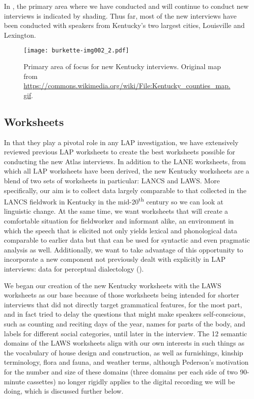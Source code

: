 \documentclass[output=paper]{langscibook}
\begin{document}
In , the primary area where we have conducted and will continue to conduct new interviews is indicated by shading. Thus far, most of the new interviews have been conducted with speakers from Kentucky’s two largest cities, Louisville and Lexington.

\begin{figure}
\texttt{[image: burkette-img002\_2.pdf]}
\caption{\label{fig:burkette:2}Primary area of focus for new Kentucky interviews. Original map from \url{https://commons.wikimedia.org/wiki/File:Kentucky_counties_map.gif}.}
\end{figure}

\subsection{Worksheets} %
\label{sec:burkette:3.5}
In that they play a pivotal role in any LAP investigation, we have extensively reviewed previous LAP worksheets to create the best worksheets possible for conducting the new Atlas interviews. In addition to the LANE worksheets, from which all LAP worksheets have been derived, the new Kentucky worksheets are a blend of two sets of worksheets in particular: LANCS and LAWS. More specifically, our aim is to collect data largely comparable to that collected in the LANCS fieldwork in Kentucky in the mid-20\textsuperscript{th} century so we can look at linguistic change. At the same time, we want worksheets that will create a comfortable situation for fieldworker and informant alike, an environment in which the speech that is elicited not only yields lexical and phonological data comparable to earlier data but that can be used for syntactic and even pragmatic analysis as well. Additionally, we want to take advantage of this opportunity to incorporate a new component not previously dealt with explicitly in LAP interviews: data for perceptual dialectology (\citealt{Preston2018, Preston2019}).

We began our creation of the new Kentucky worksheets with the LAWS worksheets \citep{Pederson1996a} as our base because of those worksheets being intended for shorter interviews that did not directly target grammatical features, for the most part, and in fact tried to delay the questions that might make speakers self-conscious, such as counting and reciting days of the year, names for parts of the body, and labels for different social categories, until later in the interview. The 12 semantic domains of the LAWS worksheets align with our own interests in such things as the vocabulary of house design and construction, as well as furnishings, kinship terminology, flora and fauna, and weather terms, although Pederson’s motivation for the number and size of these domains (three domains per each side of two 90-minute cassettes) no longer rigidly applies to the digital recording we will be doing, which is discussed further below. 
\end{document}
